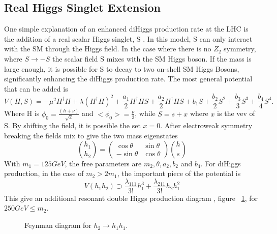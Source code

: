 \subsection{Real Higgs Singlet Extension}
One simple explanation of an enhanced diHiggs production rate at the LHC is the addition of a real scalar Higgs singlet, S \cite{Lewis:2017dme}. In this model, S can only interact with the SM through the Higgs field. In the case where there is no ${Z_{2}}$ symmetry, where ${S\rightarrow -S}$ the scalar field S mixes with the SM Higgs boson. If the mass is large enough, it is possible for S to decay to two on-shell SM Higgs Bosons, significantly enhancing the diHiggs production rate.\newline
\indent The most general potential that can be added is 
\begin{equation}
V(H,S) = -\mu^{2}H^{\dagger}H + \lambda(H^{\dagger}H)^{2} + \frac{a_{1}}{2}H^{\dagger}HS + \frac{a_{2}}{2}H^{\dagger}HS + b_{1}S + \frac{b_{2}}{2}S^{2} + \frac{b_{3}}{3}S^{3} + \frac{b_{4}}{4}S^{4}.
\end{equation}
Where H is ${\phi_{0} = \frac{(h + \nu)}{\sqrt{2}}}$ and ${<\phi_{0}> = \frac{\nu}{2}}$, while ${S = s + x}$ where ${x}$ is the vev of S. By shifting the field, it is possible the set ${x = 0}$. After electroweak symmetry breaking the fields mix to give the two mass eigenstates
\begin{equation}
\binom{h_{1}}{h_{2}} = 
\begin{pmatrix}
\cos{\theta} & \sin{\theta}\\
-\sin{\theta} & \cos{\theta}
\end{pmatrix}
\binom{h}{s}
\end{equation}
With ${m_{1} = 125 GeV}$, the free parameters are ${m_{2}, \theta,a_{2},b_{2}}$ and ${b_{4}}$. For diHiggs production, in the case of ${m_{2}>2m_{1}}$, the important piece of the potential is 
\begin{equation}
V(h_{1}h_{2}) \supset \frac{\lambda_{111}}{3!}h_{1}^{3} + \frac{\lambda_{211}}{3!}h_{2}h_{1}^{2}
\end{equation}
This give an additional resonant double Higgs production diagram , figure ~\ref{fig:FeyRes}, for ${250 GeV \leq m_{2}}$.
\begin{figure}[h]
\begin{center}
\caption[Resonant di-Higgs production diagram]{Feynman diagram for ${h_{2}\rightarrow h_{1}h_{1}}$.}
\label{fig:FeyRes}
\end{center}
\end{figure}


